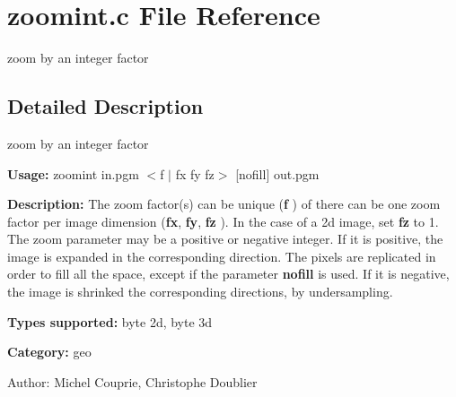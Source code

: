 \section{zoomint.c File Reference}
\label{zoomint_8c}
zoom by an integer factor 



\subsection{Detailed Description}
zoom by an integer factor 

{\bf Usage:} zoomint in.pgm $<$f $|$ fx fy fz$>$ [nofill] out.pgm

{\bf Description:} The zoom factor(s) can be unique ({\bf f} ) of there can be one zoom factor per image dimension ({\bf fx}, {\bf fy}, {\bf fz} ). In the case of a 2d image, set {\bf fz} to 1. The zoom parameter may be a positive or negative integer. If it is positive, the image is expanded in the corresponding direction. The pixels are replicated in order to fill all the space, except if the parameter {\bf nofill} is used. If it is negative, the image is shrinked the corresponding directions, by undersampling.

{\bf Types supported:} byte 2d, byte 3d

{\bf Category:} geo

\begin{Desc}
\item[Author:]Michel Couprie, Christophe Doublier \end{Desc}
